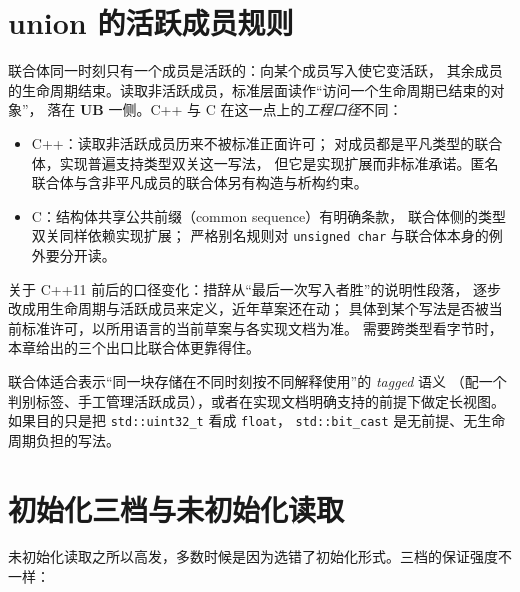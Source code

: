\documentclass[12pt,a4paper,fontset=fandol]{ctexbook}
\newcommand{\cpp}[1]{C++#1}
\newcommand{\Tp}[1]{\texttt{#1}}
\newcommand{\Lang}[1]{\textsf{#1}}
\newcommand{\CL}{\Lang{C}}
\newcommand{\CPP}{\Lang{C++}}
\newcommand{\UB}{\textbf{\textsf{UB}}}
\begin{document}
\section{union 的活跃成员规则}\label{sec:ub04-union-active-member}

联合体同一时刻只有一个成员是活跃的：向某个成员写入使它变活跃，
其余成员的生命周期结束。读取非活跃成员，标准层面读作“访问一个生命周期已结束的对象”，
落在 \UB{} 一侧。C++ 与 C 在这一点上的\emph{工程口径}不同：

\begin{itemize}
\item \CPP{}：读取非活跃成员历来不被标准正面许可；
      对成员都是平凡类型的联合体，实现普遍支持类型双关这一写法，
      但它是实现扩展而非标准承诺。匿名联合体与含非平凡成员的联合体另有构造与析构约束。
\item \CL{}：结构体共享公共前缀（common sequence）有明确条款，
      联合体侧的类型双关同样依赖实现扩展；
      严格别名规则对 \Tp{unsigned char} 与联合体本身的例外要分开读。
\end{itemize}

关于 \cpp{11} 前后的口径变化：措辞从“最后一次写入者胜”的说明性段落，
逐步改成用生命周期与活跃成员来定义，近年草案还在动；
具体到某个写法是否被当前标准许可，以所用语言的当前草案与各实现文档为准。
需要跨类型看字节时，本章给出的三个出口比联合体更靠得住。

\begin{note}[title={联合体什么时候才是对的工具}]
联合体适合表示“同一块存储在不同时刻按不同解释使用”的\emph{ tagged} 语义
（配一个判别标签、手工管理活跃成员），或者在实现文档明确支持的前提下做定长视图。
如果目的只是把 \Tp{std::uint32\_t} 看成 \Tp{float}，
\Tp{std::bit\_cast} 是无前提、无生命周期负担的写法。
\end{note}

\section{初始化三档与未初始化读取}\label{sec:ub04-initialization}

未初始化读取之所以高发，多数时候是因为选错了初始化形式。三档的保证强度不一样：
\end{document}
